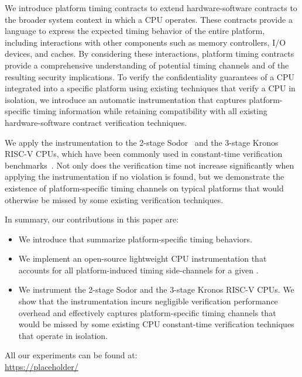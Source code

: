 We introduce platform timing contracts to extend hardware-software contracts to the broader system context in which a CPU operates.
% 
These contracts provide a language to express the expected timing behavior of the entire platform, including interactions with other components such as memory controllers, I/O devices, and caches.
By considering these interactions, platform timing contracts provide a comprehensive understanding of potential timing channels and of the resulting security implications.
To verify the confidentiality guarantees of a CPU integrated into a specific platform using existing techniques that verify a CPU in isolation, we introduce an automatic instrumentation that captures platform-specific timing information while retaining compatibility with all existing hardware-software contract verification techniques.

We apply the instrumentation to the 2-stage Sodor~\cite{sodor} and the 3-stage Kronos~\cite{kronos} RISC-V CPUs, which have been commonly used in constant-time verification benchmarks~\cite{wang2023specification,tan2025contractshadowlogic,ceesay2024mucfi}.
Not only does the verification time not increase significantly when applying the instrumentation if no violation is found, but we demonstrate the existence of platform-specific timing channels on typical platforms that would otherwise be missed by some existing verification techniques.

In summary, our contributions in this paper are:
\begin{itemize}
    \item We introduce \pics that summarize platform-specific timing behaviors.
    
    \item We implement an open-source lightweight CPU instrumentation that accounts for all platform-induced timing side-channels for a given \pic.
    
    \item We instrument the 2-stage Sodor and the 3-stage Kronos RISC-V CPUs. We show that the instrumentation incurs negligible verification performance overhead and effectively captures platform-specific timing channels that would be missed by some existing CPU constant-time verification techniques that operate in isolation.
\end{itemize}

All our experiments can be found at: \\
\url{https://placeholder/} 
